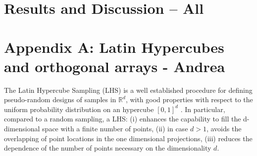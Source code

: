 \documentclass{article}
\begin{document}
%
%
%
%

\section{Results and Discussion -- All}

\section*{Appendix A: Latin Hypercubes and orthogonal arrays - Andrea}
The Latin Hypercube Sampling (LHS) is a well established procedure for defining pseudo-random designs of samples in $\mathbb R^d$, with good properties with respect to the uniform probability distribution on an hypercube $[0,1]^d$ \citep{McKay1979,Stein1987,Ranjan2014,Mingyao2016}. In particular, compared to a random sampling, a LHS: (i) enhances the capability to fill the d-dimensional space with a finite number of points, (ii) in case $d>1$, avoids the overlapping of point locations in the one dimensional projections, (iii) reduces the dependence of the number of points necessary on the dimensionality $d$.
\end{document}

